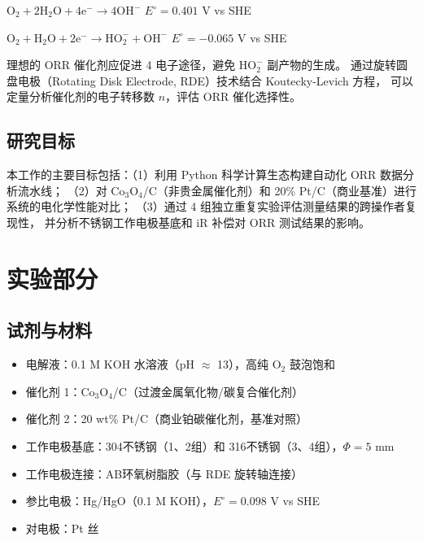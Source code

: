\documentclass[12pt,a4paper]{ctexart}
\begin{document}
\begin{description}[leftmargin=2cm,style=nextline]
  \item[4电子途径] $\mathrm{O_2 + 2H_2O + 4e^- \rightarrow 4OH^-}$ \hfill $E^\circ = 0.401$ V vs SHE
  \item[2电子途径] $\mathrm{O_2 + H_2O + 2e^- \rightarrow HO_2^- + OH^-}$ \hfill $E^\circ = -0.065$ V vs SHE
\end{description}

理想的 ORR 催化剂应促进 4 电子途径，避免 $\mathrm{HO_2^-}$ 副产物的生成。
通过旋转圆盘电极（Rotating Disk Electrode, RDE）技术结合 Koutecky-Levich 方程，
可以定量分析催化剂的电子转移数 $n$，评估 ORR 催化选择性\cite{ge2015}。

\subsection{研究目标}

本工作的主要目标包括：（1）利用 Python 科学计算生态构建自动化 ORR 数据分析流水线；
（2）对 Co$_3$O$_4$/C（非贵金属催化剂）和 20\% Pt/C（商业基准）进行系统的电化学性能对比；
（3）通过 4 组独立重复实验评估测量结果的跨操作者复现性，
并分析不锈钢工作电极基底和 iR 补偿对 ORR 测试结果的影响。

\newpage

\section{实验部分}

\subsection{试剂与材料}

\begin{itemize}[leftmargin=1.5cm]
  \item 电解液：0.1 M KOH 水溶液（pH $\approx$ 13），高纯 O$_2$ 鼓泡饱和
  \item 催化剂 1：Co$_3$O$_4$/C（过渡金属氧化物/碳复合催化剂）
  \item 催化剂 2：20 wt\% Pt/C（商业铂碳催化剂，基准对照）
  \item 工作电极基底：304不锈钢（1、2组）和 316不锈钢（3、4组），$\Phi = 5$ mm
  \item 工作电极连接：AB环氧树脂胶（与 RDE 旋转轴连接）
  \item 参比电极：Hg/HgO（0.1 M KOH），$E^\circ = 0.098$ V vs SHE
  \item 对电极：Pt 丝
\end{itemize}
\end{document}
